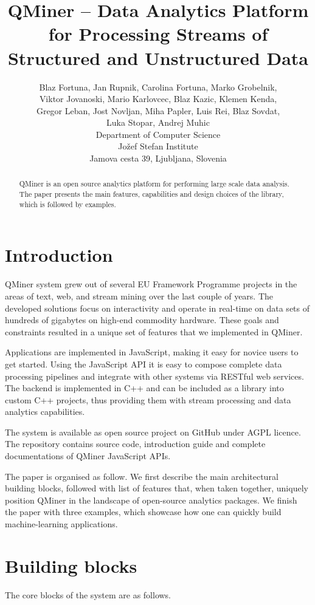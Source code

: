 \documentclass{article} %
\title{QMiner – Data Analytics Platform for Processing Streams of Structured and Unstructured Data}
\author{
Blaz Fortuna, Jan Rupnik, Carolina Fortuna, Marko Grobelnik, \\
Viktor Jovanoski, Mario Karlovcec, Blaz Kazic, Klemen Kenda, \\
Gregor Leban, Jost Novljan, Miha Papler, Luis Rei, Blaz Sovdat, \\
Luka Stopar, Andrej Muhic \\
Department of Computer Science\\
Jožef Stefan Institute\\
Jamova cesta 39, Ljubljana, Slovenia \\
}
\begin{document}
\maketitle

\begin{abstract}
QMiner is an open source analytics platform for performing large scale data analysis.
The paper presents the main features, capabilities and design choices of the library, which
is followed by examples.\end{abstract}

\section{Introduction}
QMiner system grew out of several EU Framework Programme projects in the areas of text, web, and stream mining over the last couple of years. The developed solutions focus on interactivity and operate in real-time on data sets of hundreds of gigabytes on high-end commodity hardware. These goals and constraints resulted in a unique set of features that we implemented in QMiner.

Applications are implemented in JavaScript, making it easy for novice users to get started. Using the JavaScript API it is easy to compose complete data processing pipelines and integrate with other systems via RESTful web services. The backend is implemented in C++ and can be included as a library into custom C++ projects, thus providing them with stream processing and data analytics capabilities.

The system is available as open source project on GitHub under AGPL licence. The repository contains source code, introduction guide and complete documentations of QMiner JavaScript APIs.

The paper is organised as follow. We first describe the main architectural building blocks, followed with list of features that, when taken together, uniquely position QMiner in the landscape of open-source analytics packages. We finish the paper with three examples, which showcase how one can quickly build machine-learning applications.

\section{Building blocks}
The core blocks of the system are as follows.
\end{document}
